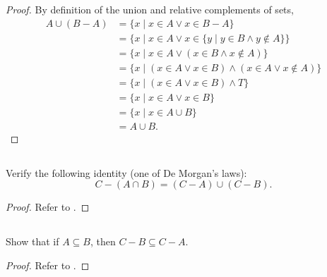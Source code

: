 \documentclass{report}
\begin{document}
\begin{proof}
    By definition of the union and relative complements of sets,
      \begin{align*}
        A \cup (B - A)
          & = \{ x \mid x \in A \lor x \in B - A \} \\
          & = \{ x \mid x \in A \lor
            x \in \{ y \mid y \in B \land y \not\in A \} \} \\
          & = \{ x \mid x \in A \lor (x \in B \land x \not\in A) \} \\
          & = \{ x \mid (x \in A \lor x \in B) \land
            (x \in A \lor x \not\in A) \} \\
          & = \{ x \mid (x \in A \lor x \in B) \land T \} \\
          & = \{ x \mid x \in A \lor x \in B \} \\
          & = \{ x \mid x \in A \cup B \} \\
          & = A \cup B.
      \end{align*}

\end{proof}

\subsection{}%

Verify the following identity (one of De Morgan's laws):
  $$C - (A \cap B) = (C - A) \cup (C - B).$$

\begin{proof}

  Refer to .

\end{proof}

\subsection{}%

Show that if $A \subseteq B$, then $C - B \subseteq C - A$.

\begin{proof}

  Refer to .

\end{proof}

\subsection{}%
\end{document}
